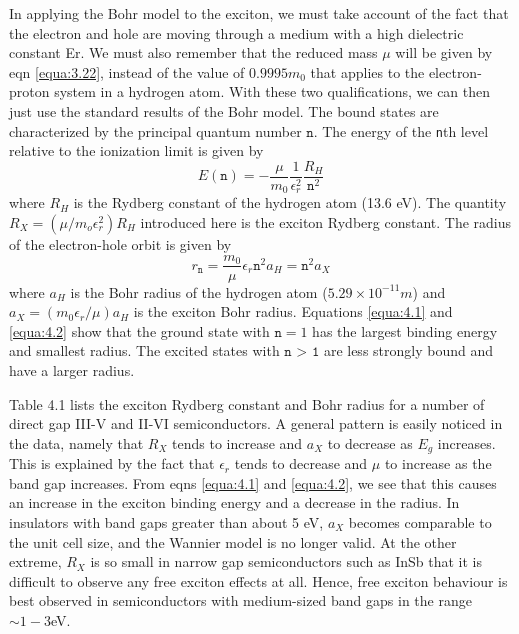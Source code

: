 \documentclass[12pt]{book}
\begin{document}
In applying the Bohr model to the exciton, we must take account of the fact that the electron and hole are moving through a medium with a high dielectric constant Er. We must also remember that the reduced mass $\mu$ will be given by eqn \ref{equa:3.22}, instead of the value of $0.9995 m_0$ that applies to the electron-proton system in a hydrogen atom. With these two qualifications, we can then just use the standard results of the Bohr model. The bound states are characterized by the principal quantum number $\texttt{n}$. The energy of the \texttt{n}th level relative to the ionization limit is given by
\begin{equation}\label{equa:4.1}
  E(\texttt{n})=-\frac{\mu}{m_0}\frac{1}{\epsilon_r^2}\frac{R_H}{\texttt{n}^2}
\end{equation}
where $R_H$ is the Rydberg constant of the hydrogen atom (13.6 eV). The quantity $R_X = (\mu/m_o\epsilon_r^2)R_H$ introduced here is the exciton Rydberg constant. The radius of the electron-hole orbit is given by
\begin{equation}\label{equa:4.2}
  r_{\texttt{n}}=\frac{m_0}{\mu}\epsilon_r\texttt{n}^2a_H=\texttt{n}^2a_X
\end{equation}
where $a_H$ is the Bohr radius of the hydrogen atom ($5.29\times 10^{-11} m$) and $a_X = (m_0\epsilon_r/\mu)a_H$ is the exciton Bohr radius. Equations \ref{equa:4.1} and \ref{equa:4.2} show that the ground state with $\texttt{n} = 1$ has the largest binding energy and smallest radius. The excited states with $\texttt{n > 1}$ are less strongly bound and have a larger radius.

Table 4.1 lists the exciton Rydberg constant and Bohr radius for a number of direct gap III-V and II-VI semiconductors. A general pattern is easily noticed in the data, namely that $R_X$ tends to increase and $a_X$ to decrease as $E_g$ increases. This is explained by the fact that $\epsilon_r$ tends to decrease and $\mu$ to increase as the band gap increases. From eqns \ref{equa:4.1} and \ref{equa:4.2}, we see that this causes an increase in the exciton binding energy and a decrease in the radius. In insulators with band gaps greater than about 5 eV, $a_X$ becomes comparable to the unit cell size, and the Wannier model is no longer valid. At the other extreme, $R_X$ is so small in narrow gap semiconductors such as InSb that it is difficult to observe any free exciton effects at all. Hence, free exciton behaviour is best observed in semiconductors with medium-sized band gaps in the range $\sim 1-3 $eV.
\end{document}
